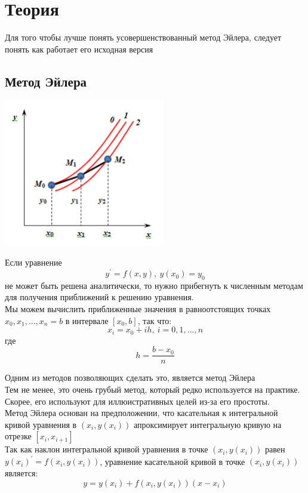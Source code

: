 \documentclass[11pt, english]{article}
\begin{document}
\tableofcontents
\newpage
\section{Теория}
Для того чтобы лучше понять усовершенствованный метод Эйлера, следует понять как работает его исходная версия
\subsection{Метод Эйлера}
\begin{center}
    \includegraphics[width=7cm]{euler-1.png}
\end{center}
Если уравнение $$y^{'} = f(x, y) ,\: y(x_0) = y_0$$ не может быть решена аналитически, то нужно прибегнуть к численным методам для получения приближений к решению уравнения.\\

Мы можем вычислить приближенные значения в равноотстоящих точках $x_0, x_1, ..., x_n = b$ в интервале $[x_0, b]$, так что:
$$x_i = x_0 + ih, \: i = 0,1,...,n$$
где
$$h = \frac{b - x_0}{n}$$

Одним из методов позволяющих сделать это, является метод Эйлера\\

Тем не менее, это очень грубый метод, который редко используется на практике. Скорее, его используют для иллюистративных целей из-за его простоты.\\

Метод Эйлера основан на предположении, что касательная к интегральной кривой уравнения в $(x_i, y(x_i))$ апроксимирует интегральную кривую на отрезке $[x_i, x_{i+1}]$\\

Так как наклон интегральной кривой уравнения в точке $(x_i, y(x_i))$ равен $y(x_i)^{'} = f(x_i, y(x_i))$, уравнение касательной кривой в точке $(x_i, y(x_i))$ является:
$$y = y(x_i) + f(x_i, y(x_i))(x - x_i)$$
\end{document}
